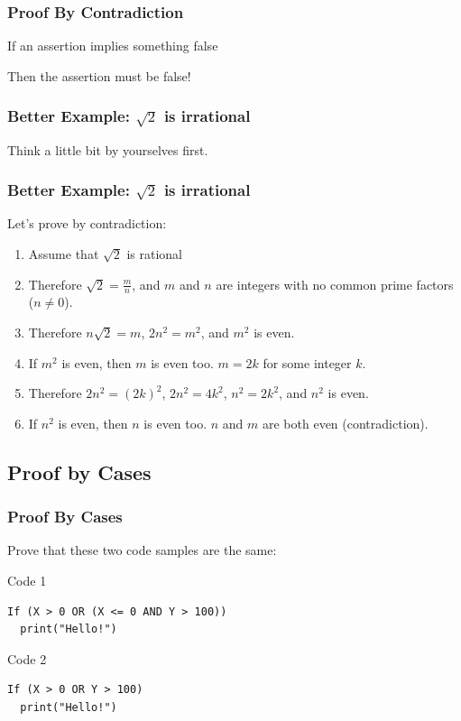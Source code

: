 \begin{frame}
  \frametitle{Proof By Contradiction}

  If an assertion \alert{implies something false}

  \bigskip

  Then the \alert{assertion must be false!}
\end{frame}

\begin{frame}
  \frametitle{Better Example: $\sqrt{2}$ is irrational}

  \begin{center}
    Think a little bit by yourselves first.
  \end{center}
\end{frame}

\begin{frame}
  \frametitle{Better Example: $\sqrt{2}$ is irrational}

  Let's prove by contradiction:

  \bigskip

  \begin{enumerate}
  \item Assume that $\sqrt{2}$ is rational
    \bigskip
  \item Therefore $\sqrt{2} = \frac{m}{n}$, and $m$ and $n$ are
    integers with \alert{no common prime factors} ($n\neq0$).
    \bigskip
  \item Therefore $n\sqrt{2} = m$, $2n^2 = m^2$, and $m^2$ is even.
    \bigskip
  \item If $m^2$ is even, then $m$ is even too. $m = 2k$ for some integer $k$.
    \bigskip
  \item Therefore $2n^2 = (2k)^2$, $2n^2 = 4k^2$, $n^2 = 2k^2$, and $n^2$ is even.
    \bigskip
  \item If $n^2$ is even, then $n$ is even too. \alert{$n$ and $m$ are both even (contradiction).}
  \end{enumerate}



\end{frame}

\subsection{Proof by Cases}

\begin{frame}[fragile]
  \frametitle{Proof By Cases}

  Prove that these two code samples are the same:

  \vfill

  \begin{block}{Code 1}
\begin{verbatim}
If (X > 0 OR (X <= 0 AND Y > 100))
  print("Hello!")
\end{verbatim}
  \end{block}
  \begin{block}{Code 2}
\begin{verbatim}
If (X > 0 OR Y > 100)
  print("Hello!")
\end{verbatim}
  \end{block}

\end{frame}


